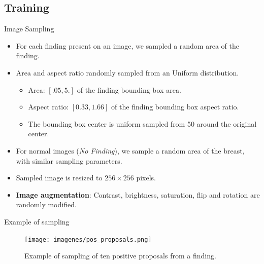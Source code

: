 \subsection{Training}
\begin{frame}{Image Sampling}
    \begin{itemize}
        \item For each finding present on an image, we sampled a random area of the finding.
        \item Area and aspect ratio randomly sampled from an Uniform distribution.
        \begin{itemize}
            \item Area: $[.05, 5.]$ of the finding bounding box area.
            \item Aspect ratio: $[0.33, 1.66]$ of the finding bounding box aspect ratio.
            \item The bounding box center is uniform sampled from \SI{50}{\pixel} around the original center.
        \end{itemize}
        \item For normal images (\emph{No Finding}), we sample a random area of the breast, with similar sampling parameters.
        \item Sampled image is resized to $256 \times 256$ pixels.
        \item \textbf{Image augmentation}: Contrast, brightness, saturation, flip and rotation are randomly modified.
    \end{itemize}
\end{frame}

\begin{frame}{Example of sampling}
    \begin{figure}
        \centering
        \texttt{[image: imagenes/pos\_proposals.png]}
        \caption{Example of sampling of ten positive proposals from a finding.}
    \end{figure}
\end{frame}

